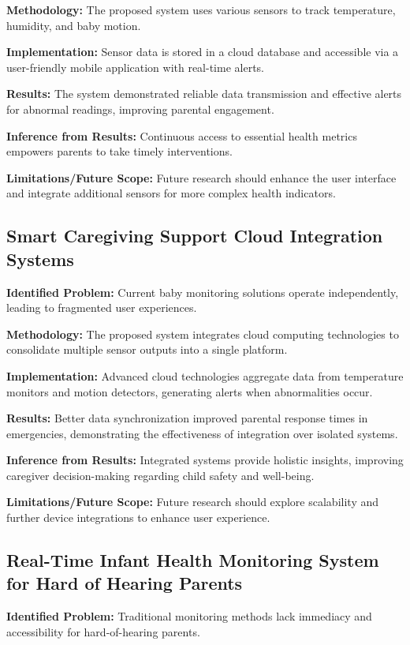 \documentclass[conference]{IEEEtran}
\begin{document}
\textbf{Methodology:} The proposed system uses various sensors to track temperature, humidity, and baby motion.

\textbf{Implementation:} Sensor data is stored in a cloud database and accessible via a user-friendly mobile application with real-time alerts.

\textbf{Results:} The system demonstrated reliable data transmission and effective alerts for abnormal readings, improving parental engagement.

\textbf{Inference from Results:} Continuous access to essential health metrics empowers parents to take timely interventions.

\textbf{Limitations/Future Scope:} Future research should enhance the user interface and integrate additional sensors for more complex health indicators.

\subsection{Smart Caregiving Support Cloud Integration Systems}
\textbf{Identified Problem:} Current baby monitoring solutions operate independently, leading to fragmented user experiences.

\textbf{Methodology:} The proposed system integrates cloud computing technologies to consolidate multiple sensor outputs into a single platform.

\textbf{Implementation:} Advanced cloud technologies aggregate data from temperature monitors and motion detectors, generating alerts when abnormalities occur.

\textbf{Results:} Better data synchronization improved parental response times in emergencies, demonstrating the effectiveness of integration over isolated systems.

\textbf{Inference from Results:} Integrated systems provide holistic insights, improving caregiver decision-making regarding child safety and well-being.

\textbf{Limitations/Future Scope:} Future research should explore scalability and further device integrations to enhance user experience.

\subsection{Real-Time Infant Health Monitoring System for Hard of Hearing Parents}
\textbf{Identified Problem:} Traditional monitoring methods lack immediacy and accessibility for hard-of-hearing parents.
\end{document}
